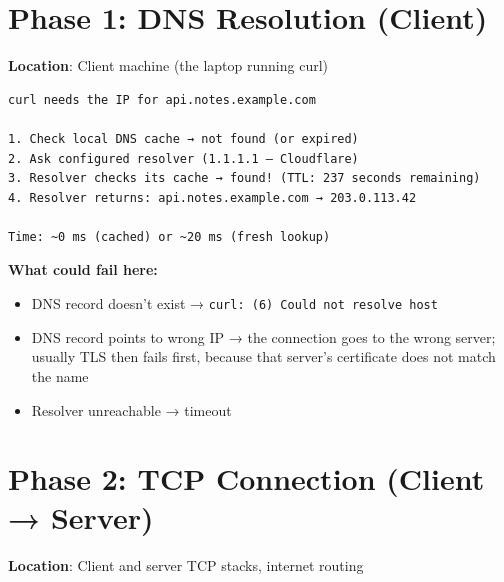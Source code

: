 \section{Phase 1: DNS Resolution (Client)}\label{29-client-server-journey:292-phase-1-dns-resolution-client}

\textbf{Location}: Client machine (the laptop running curl)

\begin{outputbox}[short]
\begin{Verbatim}[fontsize=\codesize, breaklines, breakanywhere, breaksymbolleft={\tiny\textcolor{muted}{$\hookrightarrow$}}]
curl needs the IP for api.notes.example.com

1. Check local DNS cache → not found (or expired)
2. Ask configured resolver (1.1.1.1 — Cloudflare)
3. Resolver checks its cache → found! (TTL: 237 seconds remaining)
4. Resolver returns: api.notes.example.com → 203.0.113.42

Time: ~0 ms (cached) or ~20 ms (fresh lookup)
\end{Verbatim}
\end{outputbox}

\noindent{}\textbf{What could fail here:}

\begin{itemize}
\tightlist
\item
  DNS record doesn't exist → \texttt{curl:}\allowbreak{}\texttt{\ (6)\ Could\ not\ resolve\ host}
\item
  DNS record points to wrong IP → the connection goes to the wrong server; usually TLS then fails first, because that server's certificate does not match the name
\item
  Resolver unreachable → timeout
\end{itemize}

\setcounter{section}{2}
\section{Phase 2: TCP Connection (Client → Server)}\label{29-client-server-journey:293-phase-2-tcp-connection-client--server}

\textbf{Location}: Client and server TCP stacks, internet routing

